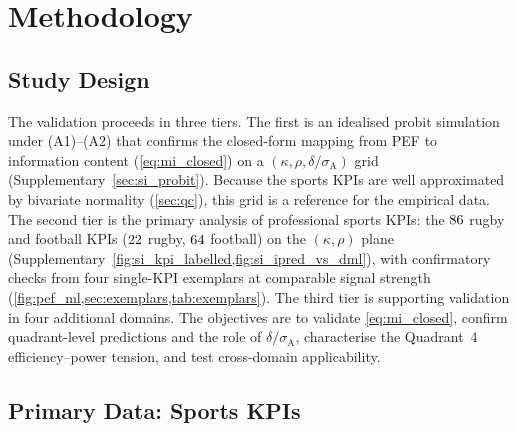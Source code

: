 \section{Methodology}
\label{sec:methods}

\subsection{Study Design}

The validation proceeds in three tiers. The first is an idealised probit simulation under (A1)--(A2) that confirms the closed-form mapping from PEF to information content (\cref{eq:mi_closed}) on a $(\kappa,\rho,\delta/\sigma_{\mathrm{A}})$ grid (Supplementary~\cref{sec:si_probit}). Because the sports KPIs are well approximated by bivariate normality (\cref{sec:qc}), this grid is a reference for the empirical data. The second tier is the primary analysis of professional sports KPIs: the $86{}$ rugby and football KPIs ($22{}$ rugby, $64{}$ football) on the $(\kappa,\rho)$ plane (Supplementary~\cref{fig:si_kpi_labelled,fig:si_ipred_vs_dml}), with confirmatory checks from four single-KPI exemplars at comparable signal strength (\cref{fig:pef_ml,sec:exemplars,tab:exemplars}). The third tier is supporting validation in four additional domains. The objectives are to validate \cref{eq:mi_closed}, confirm quadrant-level predictions and the role of $\delta/\sigma_{\mathrm{A}}$, characterise the Quadrant~4 efficiency--power tension, and test cross-domain applicability.

\subsection{Primary Data: Sports KPIs}

